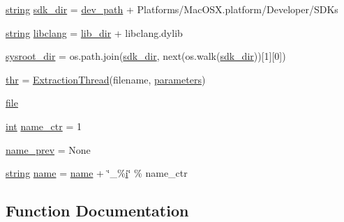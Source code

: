 \begin{DoxyCompactItemize}
\item 
\mbox{\hyperlink{asdl_8h_ae84541b4f3d8e1ea24ec0f466a8c568b}{string}} \mbox{\hyperlink{namespacemkdoc_a812adec5149aaa5538af4bd942c1f480}{sdk\+\_\+dir}} = \mbox{\hyperlink{namespacemkdoc_afd27915357cd6df92f7e64673bd208b5}{dev\+\_\+path}} + \textquotesingle{}Platforms/Mac\+O\+S\+X.\+platform/Developer/S\+D\+Ks\textquotesingle{}
\item 
\mbox{\hyperlink{asdl_8h_ae84541b4f3d8e1ea24ec0f466a8c568b}{string}} \mbox{\hyperlink{namespacemkdoc_adac3931090ead65140d186397cf36a55}{libclang}} = \mbox{\hyperlink{namespacemkdoc_a79687e87b072bd21df37d124afa374ef}{lib\+\_\+dir}} + \textquotesingle{}libclang.\+dylib\textquotesingle{}
\item 
\mbox{\hyperlink{namespacemkdoc_a1e126f52ce0b98ad1c7967e6a4034ece}{sysroot\+\_\+dir}} = os.\+path.\+join(\mbox{\hyperlink{namespacemkdoc_a812adec5149aaa5538af4bd942c1f480}{sdk\+\_\+dir}}, next(os.\+walk(\mbox{\hyperlink{namespacemkdoc_a812adec5149aaa5538af4bd942c1f480}{sdk\+\_\+dir}}))\mbox{[}1\mbox{]}\mbox{[}0\mbox{]})
\item 
\mbox{\hyperlink{namespacemkdoc_ab136f9c1bffd08b25a73887b8f6c1c91}{thr}} = \mbox{\hyperlink{classmkdoc_1_1_extraction_thread}{Extraction\+Thread}}(filename, \mbox{\hyperlink{namespacemkdoc_a2cff62850018cb669b1d13bb8c335018}{parameters}})
\item 
\mbox{\hyperlink{namespacemkdoc_a61b86360716449119d63c43972c1b1be}{file}}
\item 
\mbox{\hyperlink{warnings_8h_a74f207b5aa4ba51c3a2ad59b219a423b}{int}} \mbox{\hyperlink{namespacemkdoc_a9dd4ab426bd81d51c31af8f18171b3c5}{name\+\_\+ctr}} = 1
\item 
\mbox{\hyperlink{namespacemkdoc_a029677ada5b49414de07f350a8f3f657}{name\+\_\+prev}} = None
\item 
\mbox{\hyperlink{asdl_8h_ae84541b4f3d8e1ea24ec0f466a8c568b}{string}} \mbox{\hyperlink{namespacemkdoc_a1f8f832af63724a053f825faeeff418b}{name}} = \mbox{\hyperlink{structname}{name}} + \char`\"{}\+\_\+\%\mbox{\hyperlink{abstract_8h_a13235ab5ddf5c2ccd5ca35ab01d91328}{i}}\char`\"{} \% name\+\_\+ctr
\end{DoxyCompactItemize}


\subsection{Function Documentation}
\mbox{\label{namespacemkdoc_a85ae95dfe8536ee978dcacf1f5dcfe00}} 
